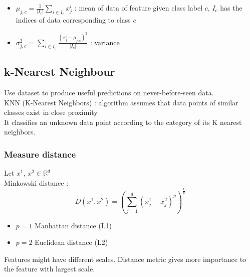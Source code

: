 \documentclass[../main.tex]{subfiles}
\begin{document}
\begin{itemize}
    \item $\mu_{j,c} = \frac{1}{\lvert I_c\rvert} \sum_{i\in I_c} x_j^i$ : mean of data of feature given class label $c$, $I_c$ has the indices of data corresponding to class $c$\\
    \item $\sigma_{j,c}^2 = \sum_{i\in I_c} \frac{(x_j^i-\mu_{j,c})^2}{\lvert I_c\rvert}$ : variance\\
\end{itemize}

\subsection{k-Nearest Neighbour}
Use dataset to produce useful predictions on never-before-seen data. \\
KNN (K-Nearest Neighbors) : algorithm assumes that data points of similar classes exist in close proximity\\

It classifies an unknown data point according to the category of its K nearest neighbors.\\

\subsubsection{Measure distance}
Let $x^1$, $x^2 \in \mathbb{R}^d$\\
Minkowski distance : \begin{equation}
    D(x^1,x^2) = (\sum_{j=1}^d(x_j^1-x_j^2)^p)^{\frac{1}{p}}
\end{equation}

\begin{itemize}
    \item $p=1$ Manhattan distance (L1)\\
    \item $p=2$ Euclidean distance (L2)\\
\end{itemize}

Features might have different scales. Distance metric gives more importance to the feature with largest scale.\\
\end{document}
